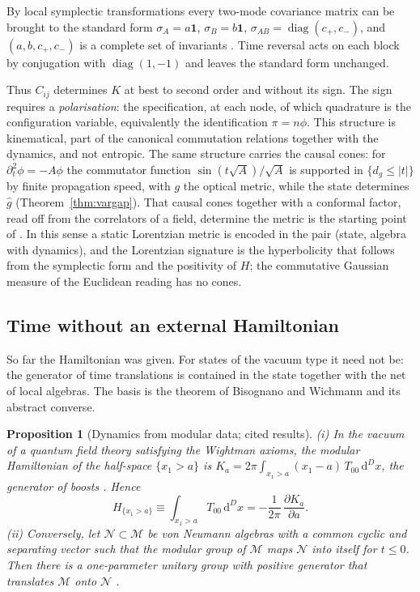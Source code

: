 \documentclass[11pt,a4paper]{article}
\makeatletter
\theoremstyle{stmt}
\newtheorem{proposition}[theorem]{Proposition}
\theoremstyle{defn}
\theoremstyle{rmk}
\renewenvironment{proof}[1][\proofname]{\par\pushQED{\qed}\normalfont\topsep6\p@\@plus6\p@\relax
  \trivlist\item[\hskip\labelsep{\sffamily\itshape\small #1.}]\ignorespaces}{\popQED\endtrivlist\@endpefalse}
\numberwithin{equation}{section}
\newcommand{\dd}{\mathrm{d}}
\makeatother
\begin{document}
\begin{proof}
By local symplectic transformations every two-mode covariance matrix can be brought to the standard form $\sigma_A=a\mathbf 1$, $\sigma_B=b\mathbf 1$, $\sigma_{AB}=\operatorname{diag}(c_+,c_-)$, and $(a,b,c_+,c_-)$ is a complete set of invariants \cite{Simon,DGCZ}. Time reversal acts on each block by conjugation with $\operatorname{diag}(1,-1)$ and leaves the standard form unchanged.
\end{proof}

Thus $C_{ij}$ determines $K$ at best to second order and without its sign. The sign requires a \emph{polarisation}: the specification, at each node, of which quadrature is the configuration variable, equivalently the identification $\pi=n\phi$. This structure is kinematical, part of the canonical commutation relations together with the dynamics, and not entropic. The same structure carries the causal cones: for $\partial_t^2\phi=-A\phi$ the commutator function $\sin(t\sqrt A)/\sqrt A$ is supported in $\{d_g\le|t|\}$ by finite propagation speed, with $g$ the optical metric, while the state determines $\hat g$ (Theorem~\ref{thm:vargap}). That causal cones together with a conformal factor, read off from the correlators of a field, determine the metric is the starting point of \cite{SAK,Kempf21,PercheMM}. In this sense a static Lorentzian metric is encoded in the pair (state, algebra with dynamics), and the Lorentzian signature is the hyperbolicity that follows from the symplectic form and the positivity of $H$; the commutative Gaussian measure of the Euclidean reading has no cones.

\subsection{Time without an external Hamiltonian}\label{sec:modular}

So far the Hamiltonian was given. For states of the vacuum type it need not be: the generator of time translations is contained in the state together with the net of local algebras. The basis is the theorem of Bisognano and Wichmann and its abstract converse.

\begin{proposition}[Dynamics from modular data; cited results]\label{prop:modular}
\textup{(i)} In the vacuum of a quantum field theory satisfying the Wightman axioms, the modular Hamiltonian of the half-space $\{x_1>a\}$ is $K_a=2\pi\int_{x_1>a}(x_1-a)\,T_{00}\,\dd^Dx$, the generator of boosts \cite{BW}. Hence
\begin{equation}\label{eq:HfromK}
H_{\{x_1>a\}}\equiv\int_{x_1>a}T_{00}\,\dd^Dx=-\frac1{2\pi}\,\frac{\partial K_a}{\partial a}.
\end{equation}
\textup{(ii)} Conversely, let $\mathcal N\subset\mathcal M$ be von Neumann algebras with a common cyclic and separating vector such that the modular group of $\mathcal M$ maps $\mathcal N$ into itself for $t\le0$. Then there is a one-parameter unitary group with positive generator that translates $\mathcal M$ onto $\mathcal N$ \cite{Borchers,Wiesbrock,ArakiZsido}.
\end{proposition}
\end{document}
